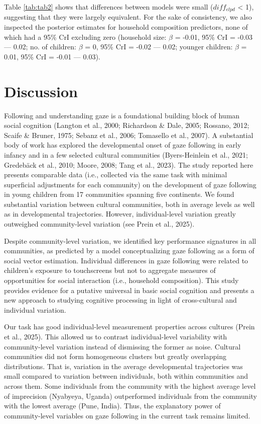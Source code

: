 \documentclass[
  man,floatsintext]{apa7}
\begin{document}
Table \ref{tab:tab2} shows that differences between models were small (\(diff_{elpd}\) \textless{} 1), suggesting that they were largely equivalent. For the sake of consistency, we also inspected the posterior estimates for household composition predictors, none of which had a 95\% CrI excluding zero (household size: \(\beta\) = -0.01, 95\% CrI = -0.03 --- 0.02; no. of children: \(\beta\) = 0, 95\% CrI = -0.02 --- 0.02; younger children: \(\beta\) = 0.01, 95\% CrI = -0.01 --- 0.03).

\section{Discussion}\label{discussion}

Following and understanding gaze is a foundational building block of human social cognition (Langton et al., 2000; Richardson \& Dale, 2005; Rossano, 2012; Scaife \& Bruner, 1975; Sebanz et al., 2006; Tomasello et al., 2007). A substantial body of work has explored the developmental onset of gaze following in early infancy and in a few selected cultural communities (Byers-Heinlein et al., 2021; Gredebäck et al., 2010; Moore, 2008; Tang et al., 2023). The study reported here presents comparable data (i.e., collected via the same task with minimal superficial adjustments for each community) on the development of gaze following in young children from 17 communities spanning five continents. We found substantial variation between cultural communities, both in average levels as well as in developmental trajectories. However, individual-level variation greatly outweighed community-level variation (see Prein et al., 2025).

Despite community-level variation, we identified key performance signatures in all communities, as predicted by a model conceptualizing gaze following as a form of social vector estimation. Individual differences in gaze following were related to children's exposure to touchscreens but not to aggregate measures of opportunities for social interaction (i.e., household composition). This study provides evidence for a putative universal in basic social cognition and presents a new approach to studying cognitive processing in light of cross-cultural and individual variation.

Our task has good individual-level measurement properties across cultures (Prein et al., 2025). This allowed us to contrast individual-level variability with community-level variation instead of dismissing the former as noise. Cultural communities did not form homogeneous clusters but greatly overlapping distributions. That is, variation in the average developmental trajectories was small compared to variation between individuals, both within communities and across them. Some individuals from the community with the highest average level of imprecision (Nyabyeya, Uganda) outperformed individuals from the community with the lowest average (Pune, India). Thus, the explanatory power of community-level variables on gaze following in the current task remains limited.
\end{document}
